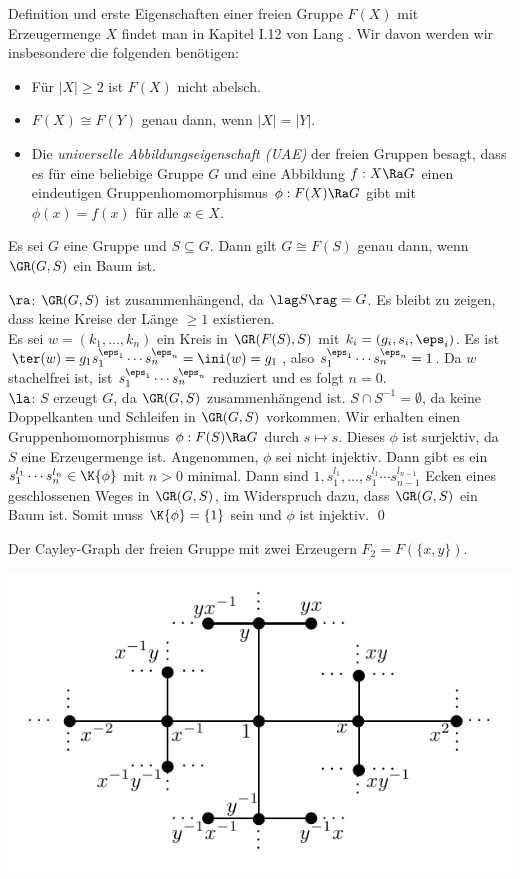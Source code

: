 Definition und erste Eigenschaften einer freien Gruppe $F(X)$
mit Erzeugermenge $X$ findet man in Kapitel I.12 von Lang \cite{lang}.
Wir davon werden wir insbesondere die folgenden benötigen:
\begin{itemize}
\item Für $|X|\geq 2$ ist $F(X)$ nicht abelsch.
\item $F(X)\cong F(Y)$ genau dann, wenn $|X|=|Y|$.
\item Die \emph{universelle Abbildungseigenschaft (UAE)}
der freien Gruppen besagt, dass es für eine beliebige Gruppe $G$ und
eine Abbildung $f:X\Ra G$ einen eindeutigen Gruppenhomomorphismus
$\phi:F(X)\Ra G$ gibt mit $\phi(x)=f(x)$ für alle $x\in X$.
\end{itemize}

\PROP\label{prop_freibaum}
Es sei $G$ eine Gruppe und $S\subseteq G$. Dann gilt
$G\cong F(S)$ genau dann, wenn $\GR(G,S)$ ein Baum ist.

\bew \glqq$\ra$\grqq:
$\GR(G,S)$ ist zusammenhängend, da $\lag S\rag=G$. Es bleibt zu
zeigen, dass keine Kreise der Länge $\geq 1$ existieren.\\
Es sei $w=(k_1,\ldots,k_n)$ ein Kreis in $\GR(F(S),S)$ mit
$k_i=(g_i,s_i,\eps_i)$.
Es ist $\ter(w)=g_1 s_1^{\eps_1}\cdots s_n^{\eps_n}
=\ini(w)=g_1$, also $s_1^{\eps_1}\cdots s_n^{\eps_n}=1$.
Da $w$ stachelfrei ist, ist $s_1^{\eps_1}\cdots s_n^{\eps_n}$
reduziert und es folgt $n=0$.\\
\glqq$\la$\grqq:
$S$ erzeugt $G$, da $\GR(G,S)$ zusammenhängend ist.
$S\cap S^{-1}=\emptyset$, da keine Doppelkanten und Schleifen
in $\GR(G,S)$ vorkommen. Wir erhalten einen Gruppenhomomorphismus
$\phi:F(S)\Ra G$ durch $s\mapsto s$.
Dieses $\phi$ ist surjektiv, da $S$ eine Erzeugermenge ist.
Angenommen, $\phi$ sei nicht injektiv. Dann gibt es ein
$s_1^{l_1}\cdots s_n^{l_n} \in \K{\phi}$ mit $n>0$ minimal.
Dann sind $1,s_1^{l_1},\ldots,s_1^{l_1}\cdots s_{n-1}^{l_{n-1}}$
Ecken eines geschlossenen Weges in $\GR(G,S)$, im Widerspruch dazu,
dass $\GR(G,S)$ ein Baum ist. Somit muss $\K{\phi}=\{1\}$ sein
und $\phi$ ist injektiv.
\qed

\BSP Der Cayley-Graph der freien Gruppe mit zwei Erzeugern
$F_2=F(\{x,y\})$.
\begin{center}
	\includegraphics{grugraImages/Fxy}
\end{center}

